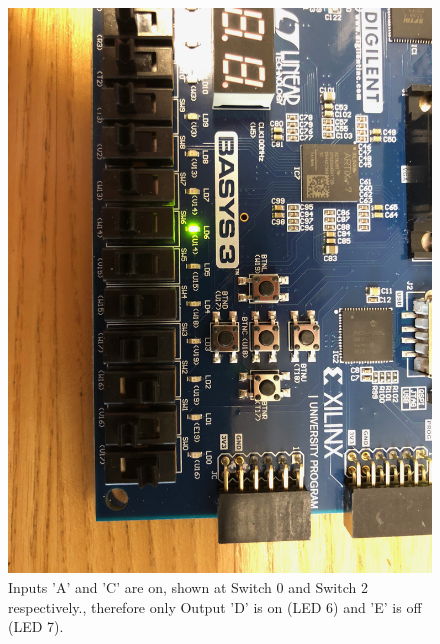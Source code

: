 \documentclass[11pt]{article}
\begin{document}
\begin{figure}[H]
	\includegraphics[width=\textwidth]{report_images/Lab1BoardPictures/Lab1Part1/IMG_0408.jpg}
	\caption{\label{fig:figure-name}Inputs 'A' and 'C' are on, shown at Switch 0 and Switch 2 respectively., therefore only Output 'D' is on (LED 6) and 'E' is off (LED 7).}
\end{figure}
\end{document}
